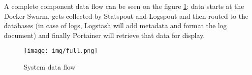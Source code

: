 \documentclass{report}
\begin{document}
A complete component data flow can be seen on the figure \ref{fig:data-flow}: data starts at the Docker Swarm, gets collected by Statspout and Logspout and then routed to the databases (in case of logs, Logstash will add metadata and format the log document) and finally Portainer will retrieve that data for display.

\begin{figure}[h]
\caption{System data flow}
\label{fig:data-flow}
\centering
\texttt{[image: img/full.png]}
\end{figure}










\end{document}
